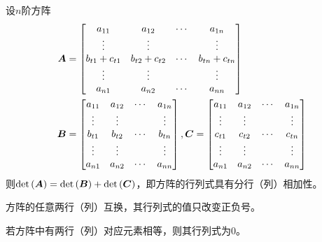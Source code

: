 \documentclass{ctexart}
\begin{document}
\begin{property}
    设\(n\)阶方阵
    \begin{align*}
        \boldsymbol{A} & =
        \begin{bmatrix}
            a_{11}        & a_{12}        & \cdots & a_{1n}        \\
            \vdots        & \vdots        &        & \vdots        \\
            b_{t1}+c_{t1} & b_{t2}+c_{t2} & \cdots & b_{tn}+c_{tn} \\
            \vdots        & \vdots        &        & \vdots        \\
            a_{n1}        & a_{n2}        & \cdots & a_{nn}
        \end{bmatrix} \\
        \boldsymbol{B} & =
        \begin{bmatrix}
            a_{11} & a_{12} & \cdots & a_{1n} \\
            \vdots & \vdots &        & \vdots \\
            b_{t1} & b_{t2} & \cdots & b_{tn} \\
            \vdots & \vdots &        & \vdots \\
            a_{n1} & a_{n2} & \cdots & a_{nn}
        \end{bmatrix},
        \boldsymbol{C}=
        \begin{bmatrix}
            a_{11} & a_{12} & \cdots & a_{1n} \\
            \vdots & \vdots &        & \vdots \\
            c_{t1} & c_{t2} & \cdots & c_{tn} \\
            \vdots & \vdots &        & \vdots \\
            a_{n1} & a_{n2} & \cdots & a_{nn}
        \end{bmatrix}
    \end{align*}
    则\(\mathrm{det}\left( \boldsymbol{A} \right)=\mathrm{det}\left( \boldsymbol{B} \right)+\mathrm{det}\left( \boldsymbol{C} \right)\)，即方阵的行列式具有分行（列）相加性。
\end{property}

\begin{property}
    方阵的任意两行（列）互换，其行列式的值只改变正负号。
\end{property}

\begin{infer}
    若方阵中有两行（列）对应元素相等，则其行列式为\(0\)。
\end{infer}
\end{document}
